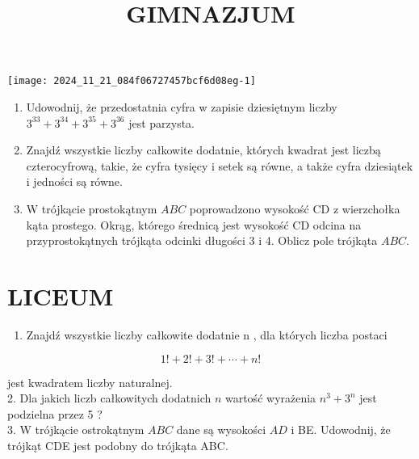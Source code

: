 \documentclass[10pt]{article}
\title{GIMNAZJUM }
\author{}
\date{}
\begin{document}
\maketitle
\begin{center}
\texttt{[image: 2024\_11\_21\_084f06727457bcf6d08eg-1]}
\end{center}

\begin{enumerate}
  \item Udowodnij, że przedostatnia cyfra w zapisie dziesiętnym liczby \(3^{33}+3^{34}+3^{35}+3^{36}\) jest parzysta.
  \item Znajdź wszystkie liczby całkowite dodatnie, których kwadrat jest liczbą czterocyfrową, takie, że cyfra tysięcy i setek są równe, a także cyfra dziesiątek i jedności są równe.
  \item W trójkącie prostokątnym \(A B C\) poprowadzono wysokość CD z wierzchołka kąta prostego. Okrąg, którego średnicą jest wysokość CD odcina na przyprostokątnych trójkąta odcinki długości 3 i 4. Oblicz pole trójkąta \(A B C\).
\end{enumerate}

\section*{LICEUM}
\begin{enumerate}
  \item Znajdź wszystkie liczby całkowite dodatnie n , dla których liczba postaci
\end{enumerate}

\[
1!+2!+3!+\cdots+n!
\]

jest kwadratem liczby naturalnej.\\
2. Dla jakich liczb całkowitych dodatnich \(n\) wartość wyrażenia \(n^{3}+3^{n}\) jest podzielna przez 5 ?\\
3. W trójkącie ostrokątnym \(A B C\) dane są wysokości \(A D\) i BE. Udowodnij, że trójkąt CDE jest podobny do trójkąta ABC.
\end{document}
